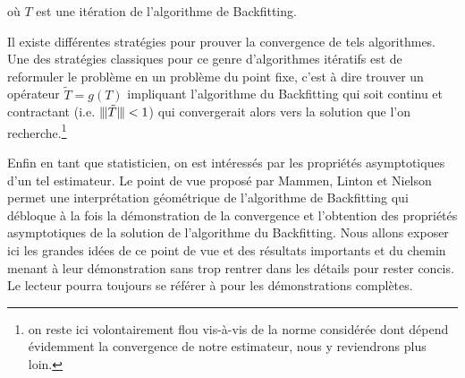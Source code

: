 {{        \begin{center}
        où $T$ est une itération de l'algorithme de Backfitting.
        \end{center}

        \bigskip

        Il existe différentes stratégies pour prouver la convergence de tels algorithmes. Une des stratégies classiques pour ce genre d'algorithmes itératifs est de reformuler le problème en un problème du point fixe, c'est à dire trouver un opérateur $\tilde T = g(T)$ impliquant l'algorithme du Backfitting qui soit continu et contractant (i.e. $\opnorm{\tilde T} < 1$) qui convergerait alors vers la solution que l'on recherche.\footnote{on reste ici volontairement flou vis-à-vis de la norme considérée dont dépend évidemment la convergence de notre estimateur, nous y reviendrons plus loin.}

        \bigskip

        Enfin en tant que statisticien, on est intéressés par les propriétés asymptotiques d'un tel estimateur. Le point de vue proposé par Mammen, Linton et Nielson permet une interprétation géométrique de l'algorithme de Backfitting qui débloque à la fois la démonstration de la convergence et l'obtention des propriétés asymptotiques de la solution de l'algorithme du Backfitting. Nous allons exposer ici les grandes idées de ce point de vue et des résultats importants et du chemin menant à leur démonstration sans trop rentrer dans les détails pour rester concis. Le lecteur pourra toujours se référer à \cite{mammen1999existence} pour les démonstrations complètes.

        }}
